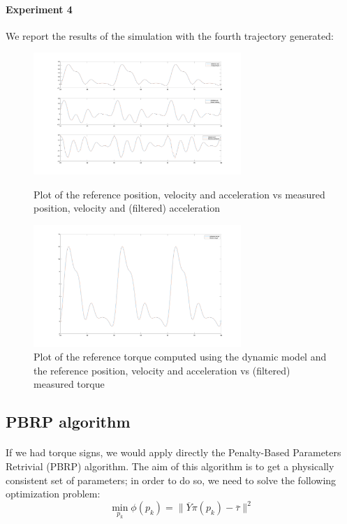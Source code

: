 \documentclass{article}
\begin{document}
\paragraph{Experiment 4}
We report the results of the simulation with the fourth trajectory generated:
\begin{figure}[!htbp]
\centering
\includegraphics[width=0.7\textwidth]{images/1-dof/new_experiment6_traj.png}
\caption{Plot of the reference position, velocity and acceleration vs measured position, velocity and (filtered) acceleration}
\includegraphics[width=0.7\textwidth]{images/1-dof/new_experiment6.png}
\caption{Plot of the reference torque computed using the dynamic model and the reference position, velocity and acceleration vs (filtered) measured torque}
\end{figure}
\pagebreak

\subsection{PBRP algorithm}
\paragraph{}If we had torque signs, we would apply directly the Penalty-Based Parameters Retrivial (PBRP) algorithm. The aim of this algorithm is to get a physically consistent set of parameters; in order to do so, we need to solve the following optimization problem:
\[\min_{p_k}{\phi(p_k)} = \lVert \overline{Y}\pi(p_k)-\overline{\tau} \rVert^2\]
\end{document}
